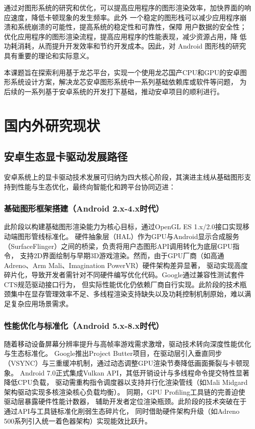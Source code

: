 通过对图形系统的研究和优化，可以提高应用程序的图形渲染效率，加快界面的响应速度，降低卡顿现象的发生频率。此外
一个稳定的图形栈可以减少应用程序崩溃和系统崩溃的可能性，提高系统的稳定性和可靠性，保障
用户数据的安全性；优化应用程序的图形渲染流程，提高应用程序的性能表现，减少资源占用，降
低功耗消耗，从而提升开发效率和节约开发成本。因此，对 Android 图形栈的研究具有重要的理论和实际意义。

本课题旨在探索利用基于龙芯平台，实现一个使用龙芯国产CPU和GPU的安卓图形系统设计方案，解决龙芯安卓图形系统中一系列基础依赖库或软件等问题，
为后续的一系列基于安卓系统的开发打下基础，推动安卓项目的顺利进行。

\section{国内外研究现状}

\subsection{安卓生态显卡驱动发展路径}
安卓系统上的显卡驱动技术发展可归纳为四大核心阶段，其演进主线从基础图形支持到性能与生态优化，最终向智能化和跨平台协同迈进：

\subsubsection{基础图形框架搭建（Android 2.x-4.x时代）}

此阶段以构建基础图形渲染能力为核心目标，通过OpenGL ES 1.x/2.0接口实现移动端图形管线标准化\cite{opengles}。
硬件抽象层（HAL）作为GPU与Android显示合成服务（SurfaceFlinger）之间的桥梁，负责将用户态图形API调用转化为底层GPU指令，
支持2D界面绘制与早期3D游戏渲染。然而，由于GPU厂商（如高通Adreno、Arm Mali\cite{mali}、Imagination PowerVR）硬件架构差异显著，
驱动实现高度碎片化，导致开发者需针对不同硬件编写优化代码。Google通过兼容性测试套件CTS\cite{android_cts}规范驱动接口行为，
但实际性能优化仍依赖厂商自行实现。此阶段的技术瓶颈集中在显存管理效率不足、多线程渲染支持缺失以及功耗控制机制原始，难以满足复杂应用场景需求。

\subsubsection{性能优化与标准化（Android 5.x-8.x时代）​}

随着移动设备屏幕分辨率提升与高帧率游戏需求激增，驱动技术转向深度性能优化与生态标准化。
Google推出Project Butter项目，在驱动层引入垂直同步（VSYNC）与三重缓冲机制，通过动态调整GPU渲染节奏降低画面撕裂与卡顿现象\cite{GoogleIO2012}。
Android 7.0正式集成Vulkan API，其低开销设计与多线程命令提交特性显著降低CPU负载\cite{vulkan}，
驱动需重构指令调度器以支持并行化渲染管线（如Mali Midgard架构驱动实现多核渲染核心负载均衡）。
同期，GPU Profiling工具链\cite{AndroidGPUProfiling}的完善迫使驱动层暴露硬件性能计数器，
辅助开发者定位渲染瓶颈\cite{陈屴2013基于}。此阶段的技术突破在于通过API与工具链标准化削弱生态碎片化，
同时借助硬件架构升级（如Adreno 500系列引入统一着色器架构\cite{adreno}）实现能效比跃升。

